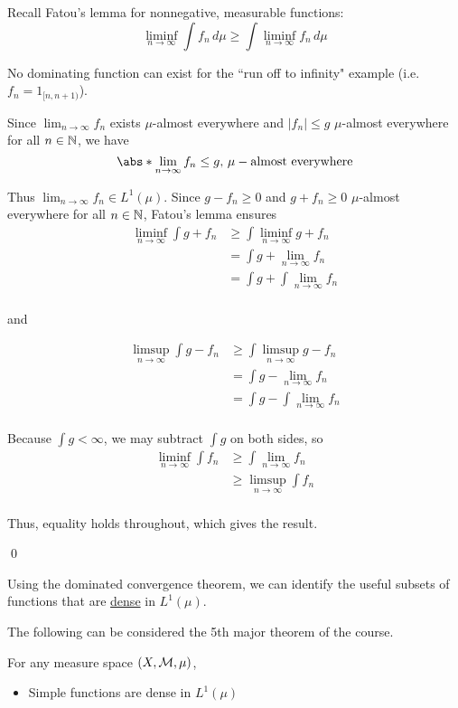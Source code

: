 \documentclass[x11names,reqno,14pt]{extarticle}
\newcommand*{\oo}{\infty}
\begin{document}
\rem

Recall Fatou's lemma for nonnegative, measurable functions:
\[
\liminf_{n\to\oo}\int f_n\,d\mu \geq \int \liminf_{n\to\oo}f_n\,d\mu
\]

No dominating function can exist for the ``run off to infinity" example (i.e. $f_n = 1_{[n, n + 1)}$).

\proof

Since $\lim_{n\to\oo}f_n$ exists $\mu$-almost everywhere and $|f_n| \leq g$ $\mu$-almost everywhere for all $n \in \mathbb{N}$, we have
\[
\abs*{\lim_{n\to\oo} f_n} \leq g, \,\mu-\text{almost everywhere}
\]

Thus $\lim_{n\to\oo}f_n\in L^1(\mu)$. Since $g - f_n \geq 0$ and $g + f_n \geq 0$ $\mu$-almost everywhere for all $n \in \mathbb{N}$, Fatou's lemma ensures
\begin{align*}
\liminf_{n\to\oo}\int g + f_n & \geq \int \liminf_{n\to\oo}g + f_n \\ & = \int g + \lim_{n\to\oo}f_n \\ & = \int g + \int\lim_{n\to\oo}f_n \\ 
\end{align*}

and

\begin{align*}
\limsup_{n\to\oo}\int g - f_n & \geq \int \limsup_{n\to\oo}g - f_n \\ & = \int g - \lim_{n\to\oo}f_n \\ & = \int g - \int\lim_{n\to\oo}f_n \\ 
\end{align*}

Because $\int g < \oo$, we may subtract $\int g$ on both sides, so 
\begin{align*}
\liminf_{n\to\oo}\int f_n & \geq \int \lim_{n\to\oo}f_n \\ & \geq \limsup_{n\to\oo}\int f_n \\
\end{align*}

Thus, equality holds throughout, which gives the result. 

\qed

Using the dominated convergence theorem, we can identify the useful subsets of functions that are \underline{dense} in $L^1(\mu)$. 

The following can be considered the 5th major theorem of the course. 

\thm

For any measure space $(X, \mathcal{M}, \mu)$, 
\begin{itemize}
\item Simple functions are dense in $L^1(\mu)$
\end{itemize}
\end{document}
